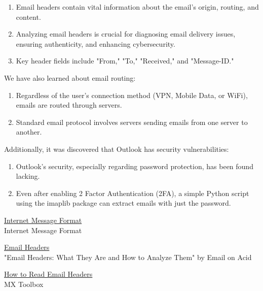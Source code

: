 \documentclass[11pt]{article}
\begin{document}
\begin{enumerate}
    \item Email headers contain vital information about the email's origin, routing, and content.
    \item Analyzing email headers is crucial for diagnosing email delivery issues, ensuring authenticity, and enhancing cybersecurity.
    \item Key header fields include "From," "To," "Received," and "Message-ID."
\end{enumerate}

We have also learned about email routing:

\begin{enumerate}
    \item Regardless of the user's connection method (VPN, Mobile Data, or WiFi), emails are routed through servers.
    \item Standard email protocol involves servers sending emails from one server to another.
\end{enumerate}

Additionally, it was discovered that Outlook has security vulnerabilities:

\begin{enumerate}
    \item Outlook's security, especially regarding password protection, has been found lacking.
    \item Even after enabling 2 Factor Authentication (2FA), a simple Python script using the imaplib package can extract emails with just the password.
\end{enumerate}

\clearpage

\pagebreak
\begin{thebibliography}{}
    \href{https://tools.ietf.org/html/rfc5322}{Internet Message Format}\\
    Internet Message Format

    \href{https://www.emailonacid.com/blog/article/email-development/mail-headers-what-they-are-and-how-to-analyze-them/}{Email Headers} \\"Email Headers: What They Are and How to Analyze Them" by Email on Acid

    \href{https://mxtoolbox.com/Public/Content/EmailHeaders/}{How to Read Email Headers} \\MX Toolbox

\end{thebibliography}
\end{document}
